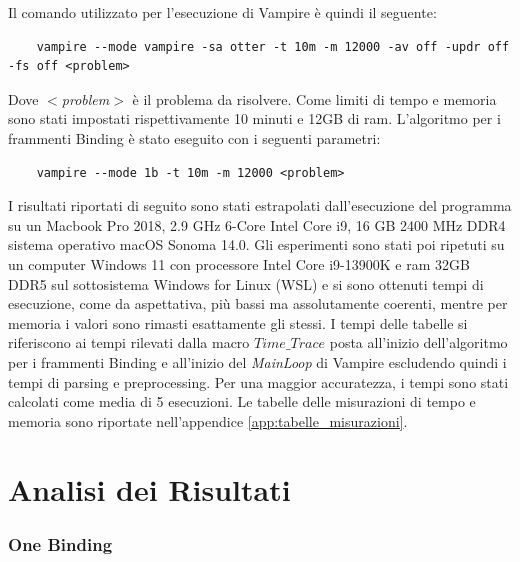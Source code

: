 \documentclass[./main.tex]{subfiles}
\begin{document}
Il comando utilizzato per l'esecuzione di Vampire è quindi il seguente:
{
\small    
\begin{verbatim}
    vampire --mode vampire -sa otter -t 10m -m 12000 -av off -updr off -fs off <problem>
\end{verbatim}}
Dove \textit{$<$problem$>$} è il problema da risolvere. 
Come limiti di tempo e memoria sono stati impostati rispettivamente 10 minuti e 12GB di ram.
L'algoritmo per i frammenti Binding è stato eseguito con i seguenti parametri:
{
\small    
\begin{verbatim}
    vampire --mode 1b -t 10m -m 12000 <problem>
\end{verbatim}}
I risultati riportati di seguito sono stati estrapolati dall'esecuzione del programma su un 
Macbook Pro 2018, 2.9 GHz 6-Core Intel Core i9, 16 GB 2400 MHz DDR4 sistema operativo macOS Sonoma 14.0.
Gli esperimenti sono stati poi ripetuti su un computer Windows 11 con processore Intel Core i9-13900K e ram 32GB DDR5
sul sottosistema Windows for Linux (WSL) e si sono ottenuti tempi di esecuzione, come da aspettativa, più bassi ma assolutamente coerenti,
mentre per memoria i valori sono rimasti esattamente gli stessi.
I tempi delle tabelle si riferiscono ai tempi rilevati dalla macro $Time\_Trace$ posta all'inizio dell'algoritmo per i frammenti Binding 
e all'inizio del \textit{MainLoop} di Vampire escludendo quindi i tempi di parsing e preprocessing.
Per una maggior accuratezza, i tempi sono stati calcolati come media di 5 esecuzioni.
Le tabelle delle misurazioni di tempo e memoria sono riportate nell'appendice \ref{app:tabelle_misurazioni}.

\section{Analisi dei Risultati}
\subsubsection{One Binding}

\end{document}
